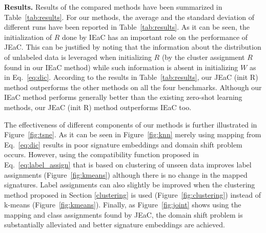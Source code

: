 \documentclass[10pt,twocolumn,letterpaper]{article}
\begin{document}
\textbf{Results.}
Results of the compared methods have been summarized in Table~\ref{tab:results}.
For our methods, the average and the standard deviation of different runs have been reported in Table~\ref{tab:results}. As it can be seen, the initialization of $R$ done by IEaC has an important role on the performance of JEaC. This can be justified by noting that the information about the distribution of
unlabeled data is leveraged when initializing $R$ (by the cluster assignment $R$ found in our IEaC method)
 while such information is absent in initializing $W$ as in Eq.~\ref{eq:dic}.
According to the results in Table~\ref{tab:results}, our JEaC (init R) method outperforms the other methods on all the four benchmarks. Although our IEaC method performs generally better than the existing zero-shot learning methods, our JEaC (init R) method outperforms IEaC too.

The effectiveness of different components of our methods is further illustrated in Figure~\ref{fig:tsne}. As it can be seen in
Figure~\ref{fig:knn} merely using mapping from Eq.~\eqref{eq:dic} results in poor signature embeddings and domain shift problem occurs. However, using the compatibility function proposed in Eq.~\ref{eq:label_assign} that is based on clustering of unseen data improves label assignments (Figure~\ref{fig:kmeans}) although there is no change in the mapped signatures.
Label assignments can also slightly be improved when the clustering method proposed in Section \ref{clustering} is used (Figure~\ref{fig:clustering}) instead of k-means (Figure~\ref{fig:kmeans}). Finally, as Figure~\ref{fig:joint} shows using
the mapping and class assignments found by JEaC, the domain shift problem is substantially alleviated and better signature embeddings are achieved.
\end{document}

